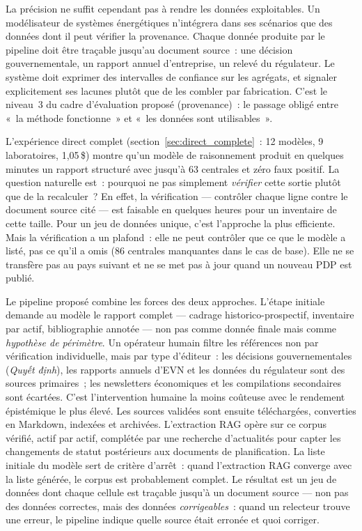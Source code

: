 \documentclass[a4paper,11pt]{report}
\begin{document}
La précision ne suffit cependant pas à rendre les données exploitables. Un modélisateur de systèmes énergétiques n'intégrera dans ses scénarios que des données dont il peut vérifier la provenance. Chaque donnée produite par le pipeline doit être traçable jusqu'au document source~: une décision gouvernementale, un rapport annuel d'entreprise, un relevé du régulateur. Le système doit exprimer des intervalles de confiance sur les agrégats, et signaler explicitement ses lacunes plutôt que de les combler par fabrication. C'est le niveau~3 du cadre d'évaluation proposé (provenance)~: le passage obligé entre «~la méthode fonctionne~» et «~les données sont utilisables~».

L'expérience direct complet (section~\ref{sec:direct_complete}~: 12 modèles, 9 laboratoires, 1,05\,\$) montre qu'un modèle de raisonnement produit en quelques minutes un rapport structuré avec jusqu'à 63 centrales et zéro faux positif. La question naturelle est~: pourquoi ne pas simplement \emph{vérifier} cette sortie plutôt que de la recalculer~? En effet, la vérification — contrôler chaque ligne contre le document source cité — est faisable en quelques heures pour un inventaire de cette taille. Pour un jeu de données unique, c'est l'approche la plus efficiente. Mais la vérification a un plafond~: elle ne peut contrôler que ce que le modèle a listé, pas ce qu'il a omis (86 centrales manquantes dans le cas de base). Elle ne se transfère pas au pays suivant et ne se met pas à jour quand un nouveau PDP est publié.

Le pipeline proposé combine les forces des deux approches. L'étape initiale demande au modèle le rapport complet — cadrage historico-prospectif, inventaire par actif, bibliographie annotée — non pas comme donnée finale mais comme \emph{hypothèse de périmètre}. Un opérateur humain filtre les références non par vérification individuelle, mais par type d'éditeur~: les décisions gouvernementales (\emph{Quyết định}), les rapports annuels d'EVN et les données du régulateur sont des sources primaires~; les newsletters économiques et les compilations secondaires sont écartées. C'est l'intervention humaine la moins coûteuse avec le rendement épistémique le plus élevé. Les sources validées sont ensuite téléchargées, converties en Markdown, indexées et archivées. L'extraction RAG opère sur ce corpus vérifié, actif par actif, complétée par une recherche d'actualités pour capter les changements de statut postérieurs aux documents de planification. La liste initiale du modèle sert de critère d'arrêt~: quand l'extraction RAG converge avec la liste générée, le corpus est probablement complet. Le résultat est un jeu de données dont chaque cellule est traçable jusqu'à un document source — non pas des données correctes, mais des données \emph{corrigeables}~: quand un relecteur trouve une erreur, le pipeline indique quelle source était erronée et quoi corriger.
\end{document}
